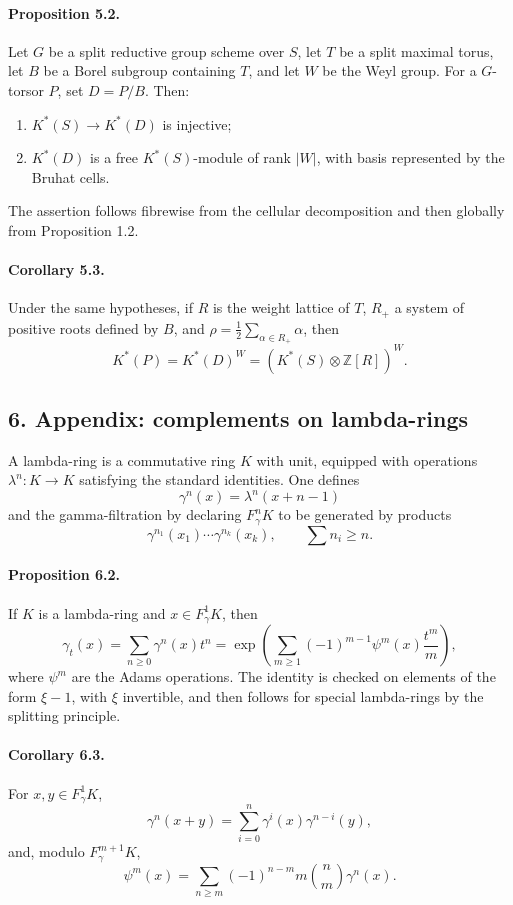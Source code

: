 \documentclass[11pt]{article}
\theoremstyle{plain}
\theoremstyle{definition}
\theoremstyle{remark}
\newcommand{\ZZ}{\mathbb Z}
\begin{document}
\paragraph{Proposition 5.2.}
Let $G$ be a split reductive group scheme over $S$, let $T$ be a split maximal torus, let $B$ be a Borel subgroup containing $T$, and let $W$ be the Weyl group. For a $G$-torsor $P$, set $D=P/B$. Then:
\begin{enumerate}[label=\roman*)]
\item $K^*(S)\to K^*(D)$ is injective;
\item $K^*(D)$ is a free $K^*(S)$-module of rank $|W|$, with basis represented by the Bruhat cells.
\end{enumerate}
The assertion follows fibrewise from the cellular decomposition and then globally from Proposition 1.2.

\paragraph{Corollary 5.3.}
Under the same hypotheses, if $R$ is the weight lattice of $T$, $R_+$ a system of positive roots defined by $B$, and $\rho=\frac12\sum_{\alpha\in R_+}\alpha$, then
\[
K^*(P)=K^*(D)^W=(K^*(S)\otimes\ZZ[R])^W.
\]

\subsection*{6. Appendix: complements on lambda-rings}

A lambda-ring is a commutative ring $K$ with unit, equipped with operations $\lambda^n:K\to K$ satisfying the standard identities. One defines
\[
\gamma^n(x)=\lambda^n(x+n-1)
\]
and the gamma-filtration by declaring $F^n_\gamma K$ to be generated by products
\[
\gamma^{n_1}(x_1)\cdots\gamma^{n_k}(x_k),\qquad \sum n_i\geq n.
\]

\paragraph{Proposition 6.2.}
If $K$ is a lambda-ring and $x\in F^1_\gamma K$, then
\[
\gamma_t(x)=\sum_{n\geq0}\gamma^n(x)t^n
=\exp\left(\sum_{m\geq1}(-1)^{m-1}\psi^m(x)\frac{t^m}{m}\right),
\]
where $\psi^m$ are the Adams operations. The identity is checked on elements of the form $\xi-1$, with $\xi$ invertible, and then follows for special lambda-rings by the splitting principle.

\paragraph{Corollary 6.3.}
For $x,y\in F^1_\gamma K$,
\[
\gamma^n(x+y)=\sum_{i=0}^n\gamma^i(x)\gamma^{n-i}(y),
\]
and, modulo $F^{m+1}_\gamma K$,
\[
\psi^m(x)=\sum_{n\geq m}(-1)^{n-m}m{n\choose m}\gamma^n(x).
\]
\end{document}
